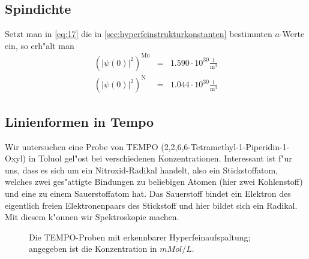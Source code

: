 \documentclass[a4paper,12pt]{article}
\begin{document}
\subsection{Spindichte}
\label{sec:spindichte}


Setzt man in \eqref{eq:17} die in \ref{sec:hyperfeinstrukturkonstanten} bestimmten
$a$-Werte ein, so erh"alt man
\begin{eqnarray*}
  \left(  |\psi(0)|^2  \right)^\text{Mn} &=&  1.590 \cdot 10^{30} \frac{1}{\operatorname{m}^3}\\
  \left(  |\psi(0)|^2  \right)^\text{N} &=& 1.044 \cdot 10^{30} \frac{1}{\operatorname{m}^3}
\end{eqnarray*}








\subsection{Linienformen in Tempo}
\label{sec:linienformen_in_tempo}


Wir untersuchen eine Probe von TEMPO
(2,2,6,6-Tetramethyl-1-Piperidin-1-Oxyl) in Toluol gel"ost bei
verschiedenen Konzentrationen. Interessant ist f"ur uns, dass es sich
um ein Nitroxid-Radikal handelt, also ein Stickstoffatom, welches zwei
ges"attigte Bindungen zu beliebigen Atomen (hier  zwei Kohlenstoff)
und eine zu einem Sauerstoffatom hat. Das Sauerstoff bindet ein
Elektron des eigentlich freien Elektronenpaars des Stickstoff und hier
bildet sich ein Radikal. Mit diesem k"onnen wir Spektroskopie machen.



\begin{figure}[!h]
  \centering
  \caption{Die TEMPO-Proben mit erkennbarer Hyperfeinaufspaltung;
    angegeben ist die Konzentration in $mMol/L$.}
  \label{fig:tempo_hyper}
\end{figure}
\end{document}
